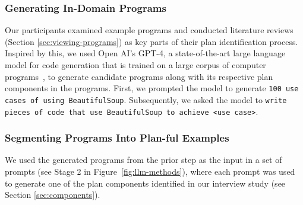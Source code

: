 
\subsubsection{Generating In-Domain Programs}

Our participants examined example programs and conducted literature reviews (Section \ref{sec:viewing-programs}) as key parts of their plan identification process. Inspired by this, we used Open AI's GPT-4, a state-of-the-art large language model for code generation that is trained on a large corpus of computer programs~\cite{liu2023isyourcode}, to generate candidate programs along with its respective plan components in the programs. First, we prompted the model to generate \texttt{100 use cases of using BeautifulSoup}. Subsequently, we asked the model to \texttt{write pieces of code that use BeautifulSoup to achieve <use case>}. 


\subsubsection{Segmenting Programs Into Plan-ful Examples}
We used the generated programs from
the prior step as the input in a set of prompts (see Stage 2 in Figure~\ref{fig:llm-methods}), where each prompt was used to generate one of the plan components identified in our interview study (see Section \ref{sec:components}). 


